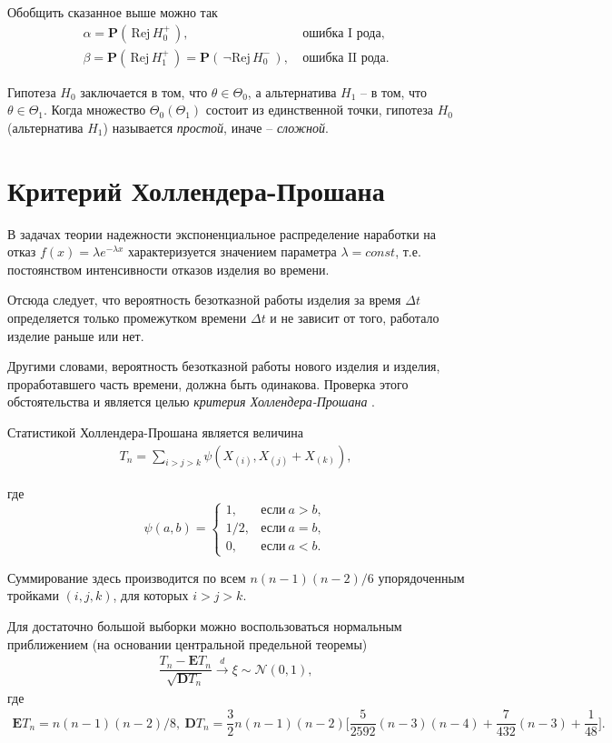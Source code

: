 \documentclass[%
	11pt,
	a4paper,
	utf8,
		]{article}
\begin{document}
Обобщить сказанное выше можно так
\begin{align*}
	\alpha = \mathbf{P}(\,\text{Rej} \, H_0^+\,),\ &\text{ошибка I рода},\\
	\beta = \mathbf{P}(\,\text{Rej} \, H_1^+\,) = \mathbf{P}(\,\neg\text{Rej} \, H_0^-\,),\ &\text{ошибка II рода}.
\end{align*}

Гипотеза $ H_0 $ заключается в том, что $ \theta \in \Theta_0 $, а альтернатива $ H_1 $ -- в том, что $ \theta \in \Theta_1 $. Когда множество $ \Theta_0 (\Theta_1) $ состоит из единственной точки, гипотеза $ H_0 $ (альтернатива $ H_1 $) называется \emph{простой}, иначе -- \emph{сложной}.


\section{Критерий Холлендера-Прошана}

В задачах теории надежности экспоненциальное распределение наработки на отказ $ f(x) = \lambda e^{-\lambda x} $ характеризуется значением параметра $ \lambda = const $, т.е. постоянством интенсивности отказов изделия во времени.

Отсюда следует, что вероятность безотказной работы изделия за время $ \Delta t $ определяется только промежутком времени $ \Delta t $ и не зависит от того, работало изделие раньше или нет.

Другими словами, вероятность безотказной работы нового изделия и изделия, проработавшего часть времени, должна быть одинакова. Проверка этого обстоятельства и является целью \emph{критерия Холлендера-Прошана} \cite[295]{kobzar:2012}.

Статистикой Холлендера-Прошана является величина \cite[182]{lagutin:2009}
\begin{align*}
	T_n = \sum_{i > j > k} \psi (X_{(i)}, X_{(j)} + X_{(k)}),
\end{align*}

где
$$
  \psi(a, b) = 
    \begin{cases}
    	1, &\text{если}\ a > b,\\
    	1/2, &\text{если}\ a = b,\\
    	0, &\text{если}\ a < b.
    \end{cases}
$$

Суммирование здесь производится по всем $ n(n-1)(n-2)/6 $ упорядоченным тройками $ (i, j, k) $, для которых $ i > j > k $.

Для достаточно большой выборки можно воспользоваться нормальным приближением (на основании центральной предельной теоремы)
\begin{align*}
	\dfrac{ T_n - \mathbf{E}T_n }{ \sqrt{\mathbf{D}T_n} } \xrightarrow{d} \xi \sim \mathcal{N}(0, 1),
\end{align*}
где
\begin{align*}
	\mathbf{E} T_n = n(n-1)(n-2)/8, \ 
	\mathbf{D} T_n = \dfrac{3}{2}n(n-1)(n-2)\Bigg[ \dfrac{5}{2592}(n - 3)(n - 4) + \dfrac{7}{432}(n - 3) + \dfrac{1}{48} \Bigg].
\end{align*}
\end{document}

